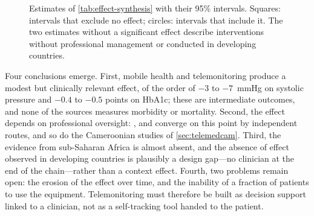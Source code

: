 \documentclass[11pt,a4paper,oneside]{report}
\begin{document}
\begin{figure}[htbp]
\centering
{}
\caption{Estimates of \cref{tab:effect-synthesis} with their 95\% intervals. Squares: intervals that exclude no effect; circles: intervals that include it. The two estimates without a significant effect describe interventions without professional management or conducted in developing countries.}\label{fig:sbp-forest}
\end{figure}

Four conclusions emerge. First, mobile health and telemonitoring produce a modest but clinically relevant effect, of the order of $-3$ to $-7$~mmHg on systolic pressure and $-0.4$ to $-0.5$ points on HbA1c; these are intermediate outcomes, and none of the sources measures morbidity or mortality. Second, the effect depends on professional oversight: \textcite{mao2020}, \textcite{bandeira2024} and \textcite{mihevc2025} converge on this point by independent routes, and so do the Cameroonian studies of \cref{sec:telemedcam}. Third, the evidence from sub-Saharan Africa is almost absent, and the absence of effect observed in developing countries is plausibly a design gap---no clinician at the end of the chain---rather than a context effect. Fourth, two problems remain open: the erosion of the effect over time, and the inability of a fraction of patients to use the equipment. Telemonitoring must therefore be built as decision support linked to a clinician, not as a self-tracking tool handed to the patient.
\end{document}

